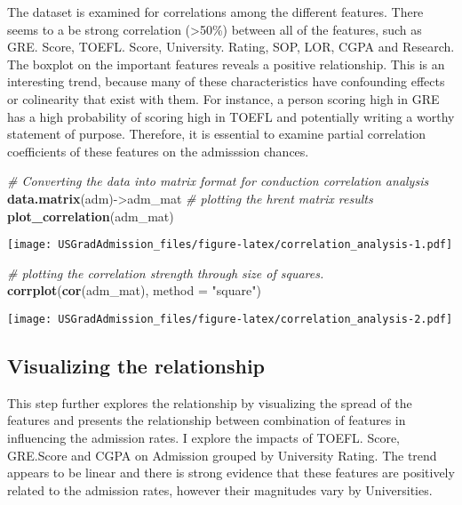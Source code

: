 \documentclass[11pt,]{article}
\newenvironment{Shaded}{\begin{snugshade}}{\end{snugshade}}
\newcommand{\CommentTok}[1]{\textcolor[rgb]{0.56,0.35,0.01}{\textit{#1}}}
\newcommand{\DataTypeTok}[1]{\textcolor[rgb]{0.13,0.29,0.53}{#1}}
\newcommand{\KeywordTok}[1]{\textcolor[rgb]{0.13,0.29,0.53}{\textbf{#1}}}
\newcommand{\NormalTok}[1]{#1}
\newcommand{\StringTok}[1]{\textcolor[rgb]{0.31,0.60,0.02}{#1}}
\begin{document}
The dataset is examined for correlations among the different features.
There seems to a be strong correlation (\textgreater{}50\%) between all
of the features, such as GRE. Score, TOEFL. Score, University. Rating,
SOP, LOR, CGPA and Research. The boxplot on the important features
reveals a positive relationship. This is an interesting trend, because
many of these characteristics have confounding effects or colinearity
that exist with them. For instance, a person scoring high in GRE has a
high probability of scoring high in TOEFL and potentially writing a
worthy statement of purpose. Therefore, it is essential to examine
partial correlation coefficients of these features on the admisssion
chances.

\begin{Shaded}
\begin{Highlighting}[]
\CommentTok{# Converting the data into matrix format for conduction correlation analysis}
\KeywordTok{data.matrix}\NormalTok{(adm)->adm_mat }
\CommentTok{# plotting the hrent matrix results}
\KeywordTok{plot_correlation}\NormalTok{(adm_mat) }
\end{Highlighting}
\end{Shaded}

\texttt{[image: USGradAdmission\_files/figure-latex/correlation\_analysis-1.pdf]}

\begin{Shaded}
\begin{Highlighting}[]
\CommentTok{# plotting the correlation strength through size of squares.}
\KeywordTok{corrplot}\NormalTok{(}\KeywordTok{cor}\NormalTok{(adm_mat), }\DataTypeTok{method =} \StringTok{"square"}\NormalTok{) }
\end{Highlighting}
\end{Shaded}

\texttt{[image: USGradAdmission\_files/figure-latex/correlation\_analysis-2.pdf]}

\hypertarget{visualizing-the-relationship}{%
\subsection{Visualizing the
relationship}\label{visualizing-the-relationship}}

This step further explores the relationship by visualizing the spread of
the features and presents the relationship between combination of
features in influencing the admission rates. I explore the impacts of
TOEFL. Score, GRE.Score and CGPA on Admission grouped by University
Rating. The trend appears to be linear and there is strong evidence that
these features are positively related to the admission rates, however
their magnitudes vary by Universities.
\end{document}
